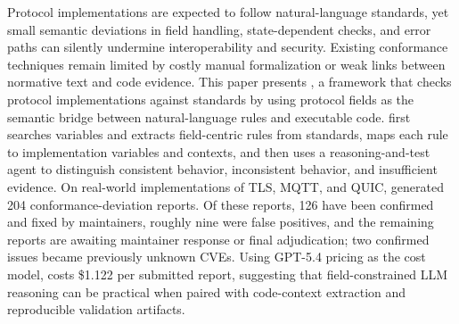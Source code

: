 Protocol implementations are expected to follow natural-language standards, yet
small semantic deviations in field handling, state-dependent checks, and error
paths can silently undermine interoperability and security. Existing conformance
techniques remain limited by costly manual formalization or weak links between
normative text and code evidence. This paper
presents \tool, a framework that checks protocol implementations against
standards by using protocol fields as the semantic bridge between
natural-language rules and executable code. \tool first searches variables and
extracts field-centric rules from standards, maps each rule to implementation
variables and contexts, and then uses a reasoning-and-test agent to distinguish
consistent behavior, inconsistent behavior, and insufficient evidence. On
real-world implementations of TLS, MQTT, and QUIC, \tool generated
204 conformance-deviation reports. Of these reports, 126 have been confirmed
and fixed by maintainers, roughly nine were false positives, and the remaining
reports are awaiting maintainer response or final adjudication; two confirmed
issues became previously unknown CVEs. Using GPT-5.4 pricing as the cost model,
\tool costs \$1.122 per submitted report, suggesting that field-constrained LLM
reasoning can be practical when paired with code-context extraction and
reproducible validation artifacts.
